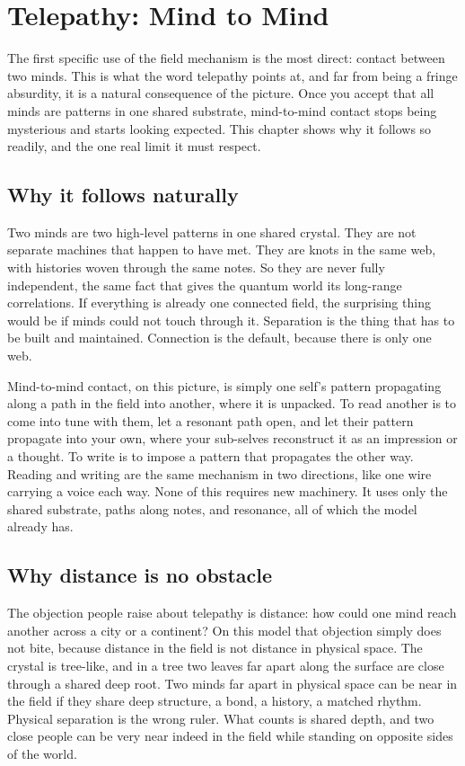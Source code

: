 \section{Telepathy: Mind to Mind}

The first specific use of the field mechanism is the most direct: contact between two minds. This is what the word telepathy points at, and far from being a fringe absurdity, it is a natural consequence of the picture. Once you accept that all minds are patterns in one shared substrate, mind-to-mind contact stops being mysterious and starts looking expected. This chapter shows why it follows so readily, and the one real limit it must respect.

\subsection{Why it follows naturally}

Two minds are two high-level patterns in one shared crystal. They are not separate machines that happen to have met. They are knots in the same web, with histories woven through the same notes. So they are never fully independent, the same fact that gives the quantum world its long-range correlations. If everything is already one connected field, the surprising thing would be if minds could not touch through it. Separation is the thing that has to be built and maintained. Connection is the default, because there is only one web.

Mind-to-mind contact, on this picture, is simply one self's pattern propagating along a path in the field into another, where it is unpacked. To read another is to come into tune with them, let a resonant path open, and let their pattern propagate into your own, where your sub-selves reconstruct it as an impression or a thought. To write is to impose a pattern that propagates the other way. Reading and writing are the same mechanism in two directions, like one wire carrying a voice each way. None of this requires new machinery. It uses only the shared substrate, paths along notes, and resonance, all of which the model already has.

\subsection{Why distance is no obstacle}

The objection people raise about telepathy is distance: how could one mind reach another across a city or a continent? On this model that objection simply does not bite, because distance in the field is not distance in physical space. The crystal is tree-like, and in a tree two leaves far apart along the surface are close through a shared deep root. Two minds far apart in physical space can be near in the field if they share deep structure, a bond, a history, a matched rhythm. Physical separation is the wrong ruler. What counts is shared depth, and two close people can be very near indeed in the field while standing on opposite sides of the world.

